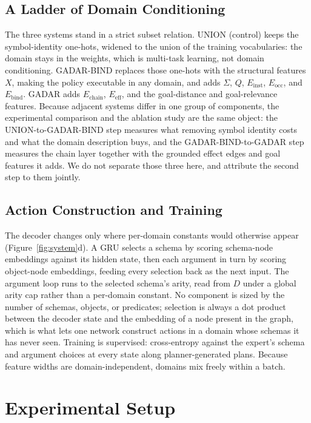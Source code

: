 \documentclass{article} %
\newcommand{\gadar}{GADAR}                 %
\newcommand{\gadarbind}{\gadar{}-BIND}     %
\newcommand{\union}{UNION}                 %
\begin{document}
\subsection{A Ladder of Domain Conditioning}

The three systems stand in a strict subset relation. \union{} (control)
keeps the symbol-identity one-hots, widened to the union of the training
vocabularies: the domain stays in the weights, which is multi-task
learning, not domain conditioning. \gadarbind{} replaces those one-hots
with the structural features $X$, making the policy executable in any
domain, and adds $\Sigma$, $Q$, $E_{\mathrm{inst}}$, $E_{\mathrm{occ}}$,
and $E_{\mathrm{bind}}$. \gadar{} adds $E_{\mathrm{chain}}$,
$E_{\mathrm{eff}}$, and the goal-distance and goal-relevance features.
Because adjacent systems differ in one group of components, the experimental
comparison and the ablation study are the same object: the
\union{}-to-\gadarbind{} step measures what removing symbol identity costs
and what the domain description buys, and the \gadarbind{}-to-\gadar{}
step measures the chain layer together with the grounded effect edges and
goal features it adds. We do not separate those three here, and attribute
the second step to them jointly.

\subsection{Action Construction and Training}

The decoder changes only where per-domain constants would otherwise appear
(Figure~\ref{fig:system}d). A GRU selects a schema by
scoring schema-node embeddings against its hidden state, then each argument
in turn by scoring object-node embeddings, feeding every selection back as
the next input. The argument loop runs to the selected schema's arity, read
from $D$ under a global arity cap rather than a per-domain constant. No
component is sized by the number of schemas, objects, or predicates;
selection is always a dot product between the decoder state and the
embedding of a node present in the graph, which is what lets one network
construct actions in a domain whose schemas it has never seen. Training is
supervised: cross-entropy against the expert's schema and argument
choices at every state along planner-generated plans. Because
feature widths are domain-independent, domains mix freely within a
batch.

\section{Experimental Setup}
\end{document}
